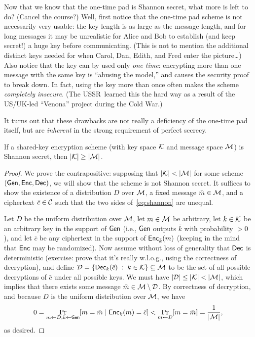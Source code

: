 \documentclass[11pt]{article}
\begin{document}
Now that we know that the one-time pad is Shannon secret, what more is
left to do?  (Cancel the course?)  Well, first notice that the
one-time pad scheme is not necessarily very usable: the key length is
as large as the message length, and for long messages it may be
unrealistic for Alice and Bob to establish (and keep secret!)  a huge
key before communicating.  (This is not to mention the additional
distinct keys needed for when Carol, Dan, Edith, and Fred enter the
picture\ldots) Also notice that the key can by used only \emph{one
  time}: encrypting more than one message with the same key is
``abusing the model,'' and causes the security proof to break down.
In fact, using the key more than once often makes the scheme
\emph{completely insecure}.  (The USSR~learned this the hard way as a
result of the US/UK-led ``Venona'' project during the Cold War.)

It turns out that these drawbacks are not really a deficiency of the
one-time pad itself, but are \emph{inherent} in the strong
requirement of perfect secrecy.

\begin{theorem}
  \label{thm:shannon}
  If a shared-key encryption scheme (with key space $\mathcal{K}$ and
  message space $\mathcal{M}$) is Shannon secret, then
  $\lvert\mathcal{K}\rvert \geq \lvert\mathcal{M}\rvert$.
\end{theorem}

\begin{proof}
  We prove the contrapositive: supposing that $\lvert\mathcal{K}\rvert <
  \lvert\mathcal{M}\rvert$ for some scheme $(\mathsf{Gen}, \mathsf{Enc}, \mathsf{Dec})$, we
  will show that the scheme is not Shannon secret.  It suffices to
  show the existence of a distribution $D$ over $\mathcal{M}$, a fixed
  message $\bar{m} \in \mathcal{M}$, and a ciphertext $\bar{c} \in
  \mathcal{C}$ such that the two sides of~\eqref{eq:shannon} are unequal.

  Let $D$ be the uniform distribution over $\mathcal{M}$, let $m \in
  \mathcal{M}$ be arbitrary, let $\bar{k} \in \mathcal{K}$ be an arbitrary
  key in the support of $\mathsf{Gen}$ (i.e., $\mathsf{Gen}$ outputs $\bar{k}$
  with probability $> 0$), and let $\bar{c}$ be any ciphertext in the
  support of $\mathsf{Enc}_{\bar{k}}(m)$ (keeping in the mind that
  $\mathsf{Enc}$ may be randomized).  Now assume without loss of generality
  that $\mathsf{Dec}$ is deterministic (exercise: prove that it's really
  w.l.o.g., using the correctness of decryption), and define $\mathcal{D} =
  \{ \mathsf{Dec}_{k}(\bar{c})\; :\; k \in \mathcal{K} \} \subseteq
  \mathcal{M}$ to be the set of all possible decryptions of $\bar{c}$
  under all possible keys.  We must have $\lvert\mathcal{D}\rvert \leq
  \lvert\mathcal{K}\rvert < \lvert\mathcal{M}\rvert$, which implies that there exists
  some message $\bar{m} \in \mathcal{M} \setminus \mathcal{D}$.  By
  correctness of decryption, and because $D$ is the uniform
  distribution over $\mathcal{M}$, we have
  \[ 0 = \Pr_{m \gets D, k \gets \mathsf{Gen}}[m=\bar{m}\; |\;
  \mathsf{Enc}_{k}(m)=\bar{c}] < \Pr_{m \gets D}[m=\bar{m}] =
  \frac{1}{\lvert\mathcal{M}\rvert}, \] as desired.
\end{proof}
\end{document}
